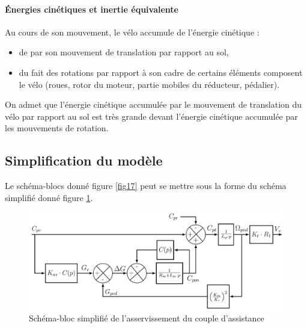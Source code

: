 \paragraph{Énergies cinétiques et inertie équivalente} Au cours de son mouvement, le vélo accumule de l’énergie
cinétique :
\begin{itemize}
 \item de par son mouvement de translation par rapport au sol,
 \item du fait des rotations par rapport à son cadre de certains éléments composent le vélo (roues, rotor du
moteur, partie mobiles du réducteur, pédalier).
\end{itemize}

On admet que l’énergie cinétique accumulée par le mouvement de translation du vélo par rapport au sol est très
grande devant l’énergie cinétique accumulée par les mouvements de rotation.


\newpage

\subsection{Simplification du modèle}

Le schéma-blocs donné figure \ref{fig17} peut se mettre sous la forme du schéma simplifié donné figure \ref{fig18}.

\begin{figure}[ht!]
\begin{center}
\includegraphics[width=.95\linewidth]{img/fig18}
\caption{\label{fig18}Schéma-bloc simplifié de l’asservissement du couple d’assistance}
\end{center}
\end{figure}


